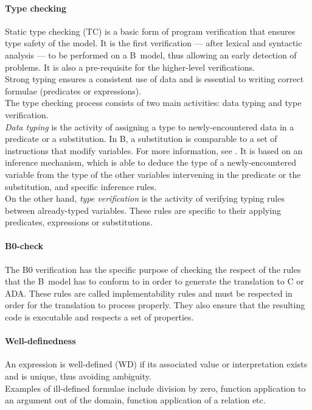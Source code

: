 \paragraph{Type checking}
Static type checking (TC) is a basic form of program verification that ensures type safety of the model. It is the first verification --- after lexical and syntactic analysis --- to be performed on a B~model, thus allowing an early detection of problems. It is also a pre-requisite for the higher-level verifications. \\
Strong typing ensures a consistent use of data and is essential to writing correct formulae (predicates or expressions).\\

The type checking process consists of two main activities: data typing and type verification.\\
{\itshape Data typing} is the activity of assigning a type to newly-encountered data in a predicate or a substitution. {In B, a substitution is comparable to a set of instructions that modify variables. For more information, see \cite{bbook}}. It is based on an inference mechanism, which is able to deduce the type of a newly-encountered variable from the type of the other variables intervening in the predicate or the substitution, and specific inference rules.\\
On the other hand, {\itshape type verification} is the activity of verifying typing rules between already-typed variables. These rules are specific to their applying predicates, expressions or substitutions.

\paragraph{B0-check}
The B0 verification has the specific purpose of checking the respect of the rules that the B~model has to conform to in order to generate the translation to C or ADA. These rules are called implementability rules and must be respected in order for the translation to process properly. They also ensure that the resulting code is executable and respects a set of properties.

\paragraph{Well-definedness}
An expression is well-defined (WD) if its associated value or interpretation exists and is unique, thus avoiding ambiguity.\\
Examples of ill-defined formulae include division by zero, function application to an argument out of the domain, function application of a relation etc.\\

